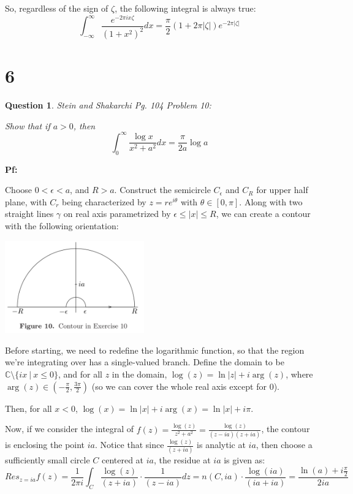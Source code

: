 \documentclass{article}
\newtheorem{question}{Question}
\begin{document}
So, regardless of the sign of $\zeta$, the following integral is always true:
$$\int_{-\infty}^{\infty}\frac{e^{-2\pi ix\zeta}}{(1+x^2)^2}dx = \frac{\pi}{2}(1+2\pi|\zeta|)e^{-2\pi|\zeta|}$$

\hfil

\hfil

\section*{6}
\begin{myBox}[]{}
    \begin{question}
        Stein and Shakarchi Pg. 104 Problem 10:

        Show that if $a>0$, then
        $$\int_{0}^{\infty}\frac{\log x}{x^2+a^2}dx = \frac{\pi}{2a}\log a$$
    \end{question}
\end{myBox}

\textbf{Pf:}

Choose $0<\epsilon<a$, and $R>a$. Construct the semicircle $C_\epsilon$ and $C_R$ for upper half plane, with $C_r$ being characterized by $z=re^{i\theta}$ with $\theta\in[0,\pi]$.
Along with two straight lines $\gamma$ on real axis parametrized by $\epsilon\leq |x|\leq R$, we can create a contour with the following orientation:

\begin{center}
    \includegraphics*[width = 60mm]{complex problem 6.png}
\end{center}

Before starting, we need to redefine the logarithmic function, so that the region we're integrating over has a single-valued branch.
Define the domain to be $\mathbb{C}\setminus\{ix\ |\ x\leq 0\}$, and for all $z$ in the domain, $\log(z)=\ln|z|+i\arg(z)$, where $\arg(z)\in (-\frac{\pi}{2},\frac{3\pi}{2})$ (so we can cover the whole real axis except for $0$).

Then, for all $x<0$, $\log(x)=\ln|x|+i\arg(x)=\ln|x|+i\pi$.

\hfil

Now, if we consider the integral of $f(z)=\frac{\log(z)}{z^2+a^2}=\frac{\log(z)}{(z-ia)(z+ia)}$, the contour is enclosing the point $ia$. 
Notice that since $\frac{\log(z)}{(z+ia)}$ is analytic at $ia$, then choose a sufficiently small circle $C$ centered at $ia$, the residue at $ia$ is given as:
$$Res_{z=ia}f(z) = \frac{1}{2\pi i}\int_{C}\frac{\log(z)}{(z+ia)}\cdot\frac{1}{(z-ia)}dz = n(C,ia)\cdot \frac{\log(ia)}{(ia+ia)} = \frac{\ln(a)+i\frac{\pi}{2}}{2ia}$$
\end{document}
